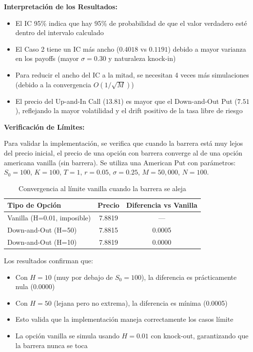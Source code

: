 \textbf{Interpretación de los Resultados:}

\begin{itemize}
    \item El IC 95\% indica que hay 95\% de probabilidad de que el valor verdadero esté dentro del intervalo calculado
    \item El Caso 2 tiene un IC más ancho ($0.4018$ vs $0.1191$) debido a mayor varianza en los payoffs (mayor $\sigma = 0.30$ y naturaleza knock-in)
    \item Para reducir el ancho del IC a la mitad, se necesitan 4 veces más simulaciones (debido a la convergencia $O(1/\sqrt{M})$)
    \item El precio del Up-and-In Call ($13.81$) es mayor que el Down-and-Out Put ($7.51$), reflejando la mayor volatilidad y el drift positivo de la tasa libre de riesgo
\end{itemize}

\textbf{Verificación de Límites:}

Para validar la implementación, se verifica que cuando la barrera está muy lejos del precio inicial, el precio de una opción con barrera converge al de una opción americana vanilla (sin barrera). Se utiliza una American Put con parámetros: $S_0 = 100$, $K = 100$, $T = 1$, $r = 0.05$, $\sigma = 0.25$, $M = 50,000$, $N = 100$.

\begin{table}[H]
\centering
\caption{Convergencia al límite vanilla cuando la barrera se aleja}
\begin{tabular}{lcc}
\toprule
\textbf{Tipo de Opción} & \textbf{Precio} & \textbf{Diferencia vs Vanilla} \\
\midrule
Vanilla (H=0.01, imposible) & 7.8819 & --- \\
Down-and-Out (H=50) & 7.8815 & 0.0005 \\
Down-and-Out (H=10) & 7.8819 & 0.0000 \\
\bottomrule
\end{tabular}
\end{table}

Los resultados confirman que:
\begin{itemize}
    \item Con $H=10$ (muy por debajo de $S_0=100$), la diferencia es prácticamente nula (0.0000)
    \item Con $H=50$ (lejana pero no extrema), la diferencia es mínima (0.0005)
    \item Esto valida que la implementación maneja correctamente los casos límite
    \item La opción vanilla se simula usando $H=0.01$ con knock-out, garantizando que la barrera nunca se toca
\end{itemize}

